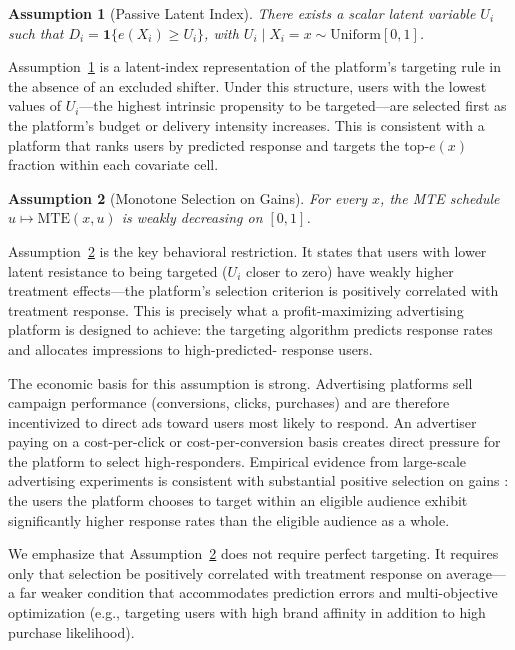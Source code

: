 \documentclass[11pt]{article}
\newtheorem{assumption}{Assumption}
\begin{document}
\begin{assumption}[Passive Latent Index]
\label{ass:passive}
There exists a scalar latent variable $U_i$ such that $D_i = \mathbf{1}\{e(X_i)
\geq U_i\}$, with $U_i \mid X_i = x \sim \mathrm{Uniform}[0,1]$.
\end{assumption}

Assumption~\ref{ass:passive} is a latent-index representation of the platform's
targeting rule in the absence of an excluded shifter.  Under this structure,
users with the lowest values of $U_i$---the highest intrinsic propensity to be
targeted---are selected first as the platform's budget or delivery intensity
increases.  This is consistent with a platform that ranks users by predicted
response and targets the top-$e(x)$ fraction within each covariate cell.

\begin{assumption}[Monotone Selection on Gains]
\label{ass:monotone}
For every $x$, the MTE schedule $u \mapsto \mathrm{MTE}(x,u)$ is weakly
decreasing on $[0,1]$.
\end{assumption}

Assumption~\ref{ass:monotone} is the key behavioral restriction.  It states that
users with lower latent resistance to being targeted ($U_i$ closer to zero) have
weakly higher treatment effects---the platform's selection criterion is
positively correlated with treatment response.  This is precisely what a
profit-maximizing advertising platform is designed to achieve: the targeting
algorithm predicts response rates and allocates impressions to high-predicted-
response users.

The economic basis for this assumption is strong.  Advertising platforms sell
campaign performance (conversions, clicks, purchases) and are therefore
incentivized to direct ads toward users most likely to respond.  An advertiser
paying on a cost-per-click or cost-per-conversion basis creates direct pressure
for the platform to select high-responders.  Empirical evidence from large-scale
advertising experiments is consistent with substantial positive selection on gains
\citep{gordon2019comparison, waisman2025multicell}: the users the platform
chooses to target within an eligible audience exhibit significantly higher
response rates than the eligible audience as a whole.

We emphasize that Assumption~\ref{ass:monotone} does not require perfect
targeting.  It requires only that selection be positively correlated with
treatment response on average---a far weaker condition that accommodates
prediction errors and multi-objective optimization (e.g., targeting users with
high brand affinity in addition to high purchase likelihood).
\end{document}
